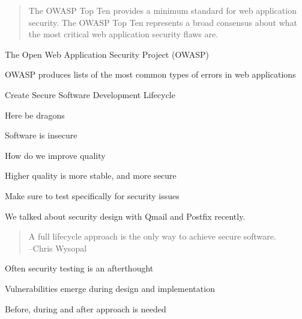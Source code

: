 \documentclass[Screen16to9,17pt]{foils}
\begin{document}


\begin{quote}
The OWASP Top Ten provides a minimum standard for web application
security. The OWASP Top Ten represents a broad consensus about what
the most critical web application security flaws are.
\end{quote}

\begin{list1}
\item The Open Web Application Security Project (OWASP)
\item OWASP produces lists of the most common types of errors in web applications
\item {}
\item Create Secure Software Development Lifecycle
\end{list1}






Here be dragons
\begin{list2}
\item Software is insecure
\item How do we improve quality
\item Higher quality is more stable, and more secure
\item Make sure to test specifically for security issues
\end{list2}

We talked about security design with Qmail and Postfix recently.




\begin{quote}
  A full lifecycle approach is the only way to achieve secure software.\\
  --Chris Wysopal
\end{quote}

\begin{list2}
\item Often security testing is an afterthought
\item Vulnerabilities emerge during design and implementation
\item Before, during and after approach is needed
\end{list2}
\end{document}
